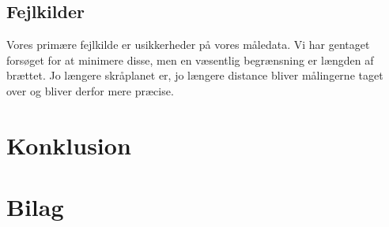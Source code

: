 \documentclass{article}
\begin{document}
\subsection*{Fejlkilder}
Vores primære fejlkilde er usikkerheder på vores måledata. Vi har gentaget forsøget for at minimere disse, men en væsentlig begrænsning er længden af brættet. Jo længere skråplanet er, jo længere distance bliver målingerne taget over og bliver derfor mere præcise. 

\section*{Konklusion}


\pagebreak

\appendix
\section{Bilag}
\end{document}
